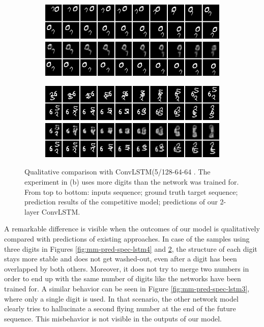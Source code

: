 \begin{figure}[h!tb]
\centering
\begin{subfigure}{0.49\textwidth}
  \centering
  \includegraphics[width=0.92\linewidth]{figures/pred/mm/spec/prediction-04.png}
  \caption{}
  \label{fig:mm-pred-spec2-clstm1}
\end{subfigure}%
\begin{subfigure}{0.49\textwidth}
  \centering
  \includegraphics[width=0.92\linewidth]{figures/pred/mm/spec/prediction-05.png}
  \caption{}
  \label{fig:mm-pred-spec2-clstm2}
\end{subfigure}
\caption[Comparison with other ConvLSTM on Moving MNIST]{Qualitative comparison with ConvLSTM(5/128-64-64 \parencite{conv_lstm_nowcasting}. The experiment in (b) uses more digits than the network was trained for. From top to bottom: inputs sequence; ground truth target sequence; prediction results of the competitive model; predictions of our 2-layer ConvLSTM.} \label{fig:mm-pred-spec2-clstm}
\end{figure}

A remarkable difference is visible when the outcomes of our model is qualitatively compared with predictions of existing approaches. In case of the samples using three digits in Figures \ref{fig:mm-pred-spec-lstm4} and \ref{fig:mm-pred-spec2-clstm2}, the structure of each digit stays more stable and does not get washed-out, even after a digit has been overlapped by both others. Moreover, it does not try to merge two numbers in order to end up with the same number of digits like the networks have been trained for. A similar behavior can be seen in Figure \ref{fig:mm-pred-spec-lstm3}, where only a single digit is used. In that scenario, the other network model clearly tries to hallucinate a second flying number at the end of the future sequence. This misbehavior is not visible in the outputs of our model.


